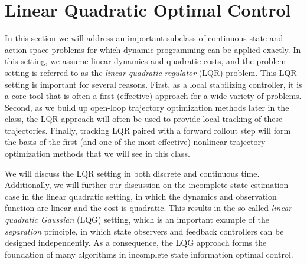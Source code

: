 \chapter{Linear Quadratic Optimal Control}


In this section we will address an important subclass of continuous state and action space problems for which dynamic programming can be applied exactly. In this setting, we assume linear dynamics and quadratic costs, and the problem setting is referred to as the \textit{linear quadratic regulator} (LQR) problem. This LQR setting is important for several reasons. First, as a local stabilizing controller, it is a core tool that is often a first (effective) approach for a wide variety of problems. Second, as we build up open-loop trajectory optimization methods later in the class, the LQR approach will often be used to provide local tracking of these trajectories. Finally, tracking LQR paired with a forward rollout step will form the basis of the first (and one of the most effective) nonlinear trajectory optimization methods that we will see in this class.

We will discuss the LQR setting in both discrete and continuous time. Additionally, we will further our discussion on the incomplete state estimation case in the linear quadratic setting, in which the dynamics and observation function are linear and the cost is quadratic. This results in the so-called \textit{linear quadratic Gaussian} (LQG) setting, which is an important example of the \textit{separation} principle, in which state observers and feedback controllers can be designed independently. As a consequence, the LQG approach forms the foundation of many algorithms in incomplete state information optimal control. 

